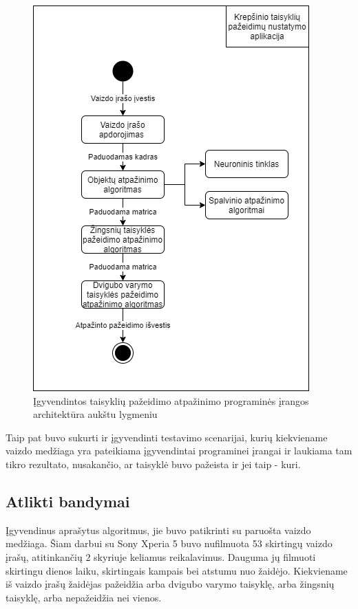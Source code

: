 \documentclass{VUMIFPSbakalaurinis}
\begin{document}
\begin{figure}[H]
	\centering
	\includegraphics[scale=0.6]{img/program_architecture}
	\caption{Įgyvendintos taisyklių pažeidimo atpažinimo programinės įrangos architektūra aukštu lygmeniu}
	\label{img:program_architecture}
\end{figure}

Taip pat buvo sukurti ir įgyvendinti testavimo scenarijai, kurių kiekviename vaizdo medžiaga yra pateikiama įgyvendintai programinei įrangai ir laukiama tam tikro rezultato, nusakančio, ar taisyklė buvo pažeista ir jei taip - kuri.  

\subsection{Atlikti bandymai}
Įgyvendinus aprašytus algoritmus, jie buvo patikrinti su paruošta vaizdo medžiaga. Šiam darbui su Sony Xperia 5 buvo nufilmuota 53 skirtingų vaizdo įrašų, atitinkančių 2 skyriuje keliamus reikalavimus. Dauguma jų filmuoti skirtingu dienos laiku, skirtingais kampais bei atstumu nuo žaidėjo. Kiekviename iš vaizdo įrašų žaidėjas pažeidžia arba dvigubo varymo taisyklę, arba žingsnių taisyklę, arba nepažeidžia nei vienos.  
\end{document}
